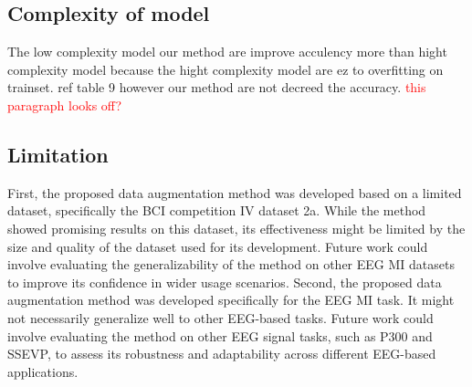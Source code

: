 \documentclass[runningheads]{llncs}
\begin{document}
\begin{table}[ht] 
\centering
\caption{ The Average accuracy improvement from our method.}\label{table: The Average accuracy improvement from our method}
\end{table}

\subsection{Complexity of model}

The low complexity model our method are improve acculency more than hight complexity model because the hight complexity model are ez to overfitting on trainset. ref table 9  however our method are not decreed the accuracy.   \textcolor{red}{this paragraph looks off?}


\subsection{Limitation}
First, the proposed data augmentation method was developed based on a limited dataset, specifically the BCI competition IV dataset 2a. While the method showed promising results on this dataset, its effectiveness might be limited by the size and quality of the dataset used for its development. Future work could involve evaluating the generalizability of the method on other EEG MI datasets to improve its confidence in wider usage scenarios.  Second, the proposed data augmentation method was developed specifically for the EEG MI task. It might not necessarily generalize well to other EEG-based tasks. Future work could involve evaluating the method on other EEG signal tasks, such as P300 and SSEVP, to assess its robustness and adaptability across different EEG-based applications.
\end{document}
